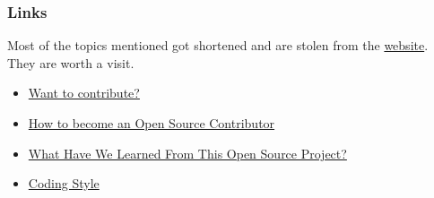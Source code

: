 \documentclass[t,handout]{beamer}
\begin{document}
\begin{frame}[fragile]\frametitle{Links}
    Most of the topics mentioned got shortened and are stolen from the \href{http://taskwarrior.org}{website}. They are worth a visit.

    \begin{itemize}
        \item \href{https://taskwarrior.org/docs/contribute.html}{Want to contribute?}
        \item \href{https://taskwarrior.org/docs/first_time.html}{How to become an Open Source Contributor}
        \item \href{https://taskwarrior.org/docs/advice.html}{What Have We Learned From This Open Source Project?}
        \item \href{https://taskwarrior.org/docs/coding_style.html}{Coding Style}
    \end{itemize}
\end{frame}
\end{document}
